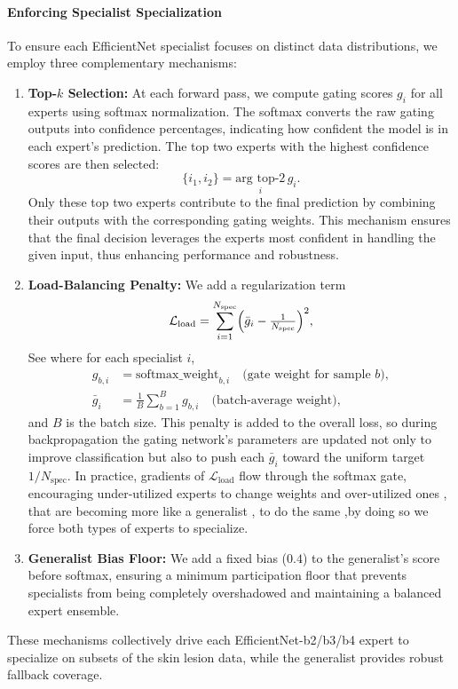 \paragraph{Enforcing Specialist Specialization}
To ensure each EfficientNet specialist focuses on distinct data distributions, we employ three complementary mechanisms:
\begin{enumerate}
\item \textbf{Top-$k$ Selection:} At each forward pass, we compute gating scores $g_i$ for all experts using softmax normalization. The softmax converts the raw gating outputs into confidence percentages, indicating how confident the model is in each expert's prediction. The top two experts with the highest confidence scores are then selected:
\begin{equation*}
\{i_1, i_2\} = \underset{i}{\text{arg top-2}}\, g_i.
\end{equation*}
Only these top two experts contribute to the final prediction by combining their outputs with the corresponding gating weights. This mechanism ensures that the final decision leverages the experts most confident in handling the given input, thus enhancing performance and robustness.

\item \textbf{Load-Balancing Penalty:} We add a regularization term
  \begin{equation*}
    \mathcal{L}_{\text{load}} = \sum_{i=1}^{N_{\text{spec}}} \Bigl(\bar{g}_i - \tfrac{1}{N_{\text{spec}}}\Bigr)^2,
  \end{equation*}
   See \cite{fedus2021switch,shazeer2017outrageously}
  where for each specialist $i$,
  \begin{align*}
    g_{b,i} &= \text{softmax\_weight}_{b,i}  \quad\text{(gate weight for sample $b$)},\\
    \bar{g}_i &= \frac{1}{B} \sum_{b=1}^{B} g_{b,i}  \quad\text{(batch-average weight)},
  \end{align*}
  and $B$ is the batch size. This penalty is added to the overall loss, so during backpropagation the gating network's parameters are updated not only to improve classification but also to push each $\bar{g}_i$ toward the uniform target $1/N_{\text{spec}}$. In practice, gradients of $\mathcal{L}_{\text{load}}$ flow through the softmax gate, encouraging under-utilized experts to change weights and over-utilized ones , that are becoming more like a generalist , to do the same ,by doing so we force both types of experts  to specialize.
\item \textbf{Generalist Bias Floor:} We add a fixed bias ($0.4$) to the generalist’s score before softmax, ensuring a minimum participation floor that prevents specialists from being completely overshadowed and maintaining a balanced expert ensemble.
\end{enumerate}
These mechanisms collectively drive each EfficientNet-b2/b3/b4 expert to specialize on subsets of the skin lesion data, while the generalist provides robust fallback coverage.

